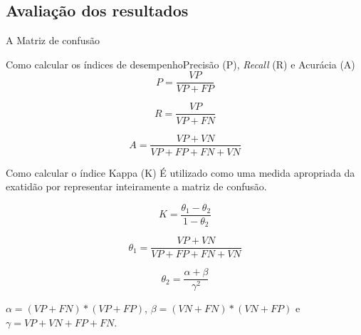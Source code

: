 
\subsection{Avaliação dos resultados} %
\label{sub:avalia_o_dos_resultados}

\begin{frame}{A Matriz de confusão}
  
\end{frame}

\begin{frame}{Como calcular os índices de desempenho}{Precisão (P), \textit{Recall} (R) e Acurácia (A)}
  \begin{equation}
    \label{eq:precisao}
    P=\dfrac{VP}{VP+FP}
  \end{equation}

  \begin{equation}
    \label{eq:recall}
    R=\dfrac{VP}{VP+FN}
  \end{equation}

  \begin{equation}
    \label{eq:acuracia}
    A=\dfrac{VP+VN}{VP+FP+FN+VN}
  \end{equation}
\end{frame}

\begin{frame}{Como calcular o índice Kappa (K)}
  É utilizado como uma medida apropriada da exatidão por representar inteiramente a matriz de confusão.

  \begin{equation}
    \label{eq:kappa}
    K=\dfrac{\theta_{1}-\theta_{2}}{1-\theta_{2}}
  \end{equation}

  \begin{equation*}
    \label{eq:theta_1}
    \theta_{1}=\dfrac{VP+VN}{VP+FP+FN+VN}
  \end{equation*}

  \begin{equation*}
    \label{eq:theta_2}
    \theta_{2}=\dfrac{\alpha+\beta}{\gamma^{2}}
  \end{equation*}

  $\alpha=(VP+FN)*(VP+FP)$, $\beta=(VN+FN)*(VN+FP)$ e $\gamma=VP+VN+FP+FN$.

\end{frame} 

